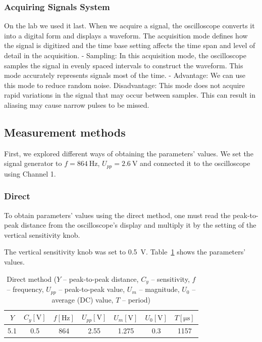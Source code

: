 \subsubsection*{Acquiring Signals System}
On the lab we used it last.
When we acquire a signal, the oscilloscope converts it into a digital form and
displays a waveform. The acquisition mode defines how the signal is digitized and
the time base setting affects the time span and level of detail in the acquisition.
- Sampling: In this acquisition mode, the oscilloscope samples the signal in
evenly spaced intervals to construct the waveform. This mode accurately
represents signals most of the time.
- Advantage: We can use this mode to reduce random noise.
  Disadvantage: This mode does not acquire rapid variations in the signal that may occur between samples. This can result in aliasing may cause narrow pulses to be
  missed.

\subsection{Measurement methods}

First, we explored different ways of obtaining the parameters' values. We set the signal generator to $f = \SI{864}{\hertz}$, $U_{pp} = \SI{2.6}{\volt}$ and connected it to the oscilloscope using Channel 1.

\subsubsection*{Direct}

 To obtain parameters' values using the direct method, one must read the peak-to-peak distance from the oscilloscope's display and multiply it by the setting of the vertical sensitivity knob.

The vertical sensitivity knob was set to \SI{0.5}{\volt}. Table~\ref{tab:direct-method} shows the parameters' values.

\begin{table}[H]
	\centering
	\begin{tabular}{c|c|c|c|c|c|c}
		$Y$ & $C_{y} [\unit{\volt}]$ & $f [\unit{\hertz}]$ & $U_{pp} [\unit{\volt}]$ & $U_{m} [\unit{\volt}]$ & $U_{0} [\unit{\volt}]$ & $T [\unit{\micro\second}]$\\
		\hline
		5.1 & 0.5 & 864 & 2.55 & 1.275 & 0.3 & 1157
	\end{tabular}
	\caption{Direct method ($Y$ -- peak-to-peak distance, $C_{y}$ -- sensitivity, $f$ -- frequency, $U_{pp}$ -- peak-to-peak value, $U_{m}$ -- magnitude, $U_{0}$ -- average (DC) value, $T$ -- period)}
	\label{tab:direct-method}
\end{table}

